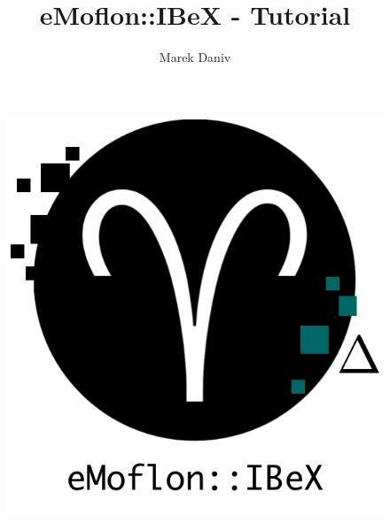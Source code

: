 \documentclass[
	ngerman,
	xcolor=(dvipsnames,svgnames,table),
	type=intern,
	marginpar=false,%
	accentcolor=1b%
]{tudapub}
\begin{document}
\frontmatter

\title{eMoflon::IBeX - Tutorial}
\author{Marek Daniv}%

\maketitle

\begin{figure}[h]
	\centering
	\includegraphics[scale=0.6]{pictures/eMoflonLogoIbex.png}
\end{figure}

\newpage
\tableofcontents

\mainmatter









%
%
	
\end{document}
